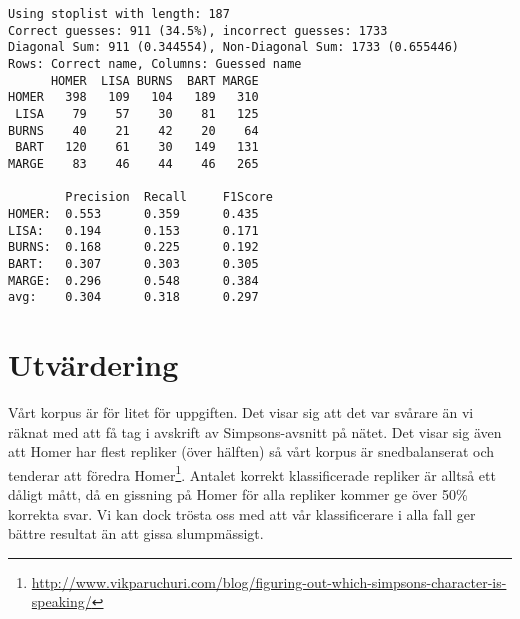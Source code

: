 \documentclass[a4paper]{article}
\begin{document}
\begin{verbatim}
Using stoplist with length: 187
Correct guesses: 911 (34.5%), incorrect guesses: 1733
Diagonal Sum: 911 (0.344554), Non-Diagonal Sum: 1733 (0.655446)
Rows: Correct name, Columns: Guessed name
      HOMER  LISA BURNS  BART MARGE 
HOMER   398   109   104   189   310 
 LISA    79    57    30    81   125 
BURNS    40    21    42    20    64 
 BART   120    61    30   149   131 
MARGE    83    46    44    46   265 

        Precision  Recall     F1Score    
HOMER:  0.553      0.359      0.435      
LISA:   0.194      0.153      0.171      
BURNS:  0.168      0.225      0.192      
BART:   0.307      0.303      0.305      
MARGE:  0.296      0.548      0.384      
avg:    0.304      0.318      0.297      
\end{verbatim}


\section{Utvärdering}
Vårt korpus är för litet för uppgiften. Det visar sig att det var svårare än vi
räknat med att få tag i avskrift av Simpsons-avsnitt på nätet. Det visar sig
även att Homer har flest repliker (över hälften) så vårt korpus är
snedbalanserat och tenderar att föredra
Homer\footnote{\url{http://www.vikparuchuri.com/blog/figuring-out-which-simpsons-character-is-speaking/}}.
Antalet korrekt klassificerade repliker är alltså ett dåligt mått, då en
gissning på Homer för alla repliker kommer ge över 50\% korrekta svar. Vi kan
dock trösta oss med att vår klassificerare i alla fall ger bättre resultat än
att gissa slumpmässigt.


\end{document}

